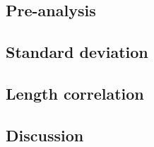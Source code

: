 
\subsection{Pre-analysis}

\subsection{Standard deviation}

\subsection{Length correlation}

\subsection{Discussion}
